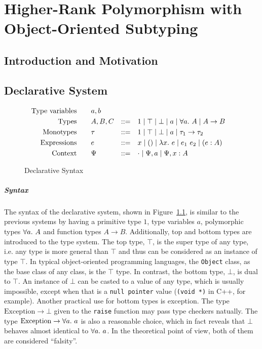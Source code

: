 \chapter{Higher-Rank Polymorphism with Object-Oriented Subtyping}
\label{chap:Top}


\section{Introduction and Motivation}


\section{Declarative System}

\begin{figure}[t]
    \begin{gather*}
    \begin{aligned}
        \text{Type variables}\qquad&a, b\\
        \text{Types}\qquad&A, B, C &::=&\quad 1 \mid \top \mid \bot \mid a \mid \all A \mid A\to B\\
        \text{Monotypes}\qquad&\tau &::=&\quad 1 \mid \top \mid \bot \mid a \mid \tau_1\to \tau_2\\
        \text{Expressions}\qquad&e &::=&\quad x \mid () \mid \lam e \mid e_1~e_2 \mid (e:A)\\
        \text{Context}\qquad&\Psi &::=&\quad \cdot \mid \Psi, a \mid \Psi, x:A
    \end{aligned}
    \end{gather*}
\caption{Declarative Syntax}\label{fig:top_decl_syntax}
\end{figure}

\paragraph{Syntax}
The syntax of the declarative system, shown in Figure~\ref{fig:top_decl_syntax},
is similar to the previous systems by having
a primitive type $1$, type variables $a$,
polymorphic types $\all A$ and function types $A \to B$.
Additionally, top and bottom types are introduced to the type system.
The top type, $\top$, is the super type of any type,
i.e. any type is more general than $\top$
and thus can be considered as an instance of type $\top$.
In typical object-oriented programming languages, the \texttt{Object} class,
as the base class of any class, is the $\top$ type.
In contrast, the bottom type, $\bot$, is dual to $\top$.
An instance of $\bot$ can be casted to a value of any type, which is usually impossible,
except when that is a \texttt{null pointer} value (\texttt{(void *)} in C++, for example).
Another practical use for bottom types is exception.
The type $\text{Exception} \to \bot$ given to the \texttt{raise}
function may pass type checkers natually.
The type $\text{Exception} \to \all a$ is also a reasonable choice,
which in fact reveals that $\bot$ behaves almost identical to $\all a$.
In the theoretical point of view, both of them are considered ``falsity''.

